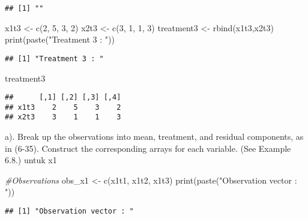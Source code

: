 \documentclass[
]{article}
\newenvironment{Shaded}{\begin{snugshade}}{\end{snugshade}}
\newcommand{\CommentTok}[1]{\textcolor[rgb]{0.56,0.35,0.01}{\textit{#1}}}
\newcommand{\DecValTok}[1]{\textcolor[rgb]{0.00,0.00,0.81}{#1}}
\newcommand{\FunctionTok}[1]{\textcolor[rgb]{0.00,0.00,0.00}{#1}}
\newcommand{\NormalTok}[1]{#1}
\newcommand{\OtherTok}[1]{\textcolor[rgb]{0.56,0.35,0.01}{#1}}
\newcommand{\StringTok}[1]{\textcolor[rgb]{0.31,0.60,0.02}{#1}}
\begin{document}
\begin{verbatim}
## [1] ""
\end{verbatim}

\begin{Shaded}
\begin{Highlighting}[]
\NormalTok{x1t3 }\OtherTok{\textless{}{-}} \FunctionTok{c}\NormalTok{(}\DecValTok{2}\NormalTok{, }\DecValTok{5}\NormalTok{, }\DecValTok{3}\NormalTok{, }\DecValTok{2}\NormalTok{)}
\NormalTok{x2t3 }\OtherTok{\textless{}{-}} \FunctionTok{c}\NormalTok{(}\DecValTok{3}\NormalTok{, }\DecValTok{1}\NormalTok{, }\DecValTok{1}\NormalTok{, }\DecValTok{3}\NormalTok{)}
\NormalTok{treatment3 }\OtherTok{\textless{}{-}} \FunctionTok{rbind}\NormalTok{(x1t3,x2t3)}
\FunctionTok{print}\NormalTok{(}\FunctionTok{paste}\NormalTok{(}\StringTok{"Treatment 3 : "}\NormalTok{))}
\end{Highlighting}
\end{Shaded}

\begin{verbatim}
## [1] "Treatment 3 : "
\end{verbatim}

\begin{Shaded}
\begin{Highlighting}[]
\NormalTok{treatment3}
\end{Highlighting}
\end{Shaded}

\begin{verbatim}
##      [,1] [,2] [,3] [,4]
## x1t3    2    5    3    2
## x2t3    3    1    1    3
\end{verbatim}

a). Break up the observations into mean, treatment, and residual
components, as in (6-35). Construct the corresponding arrays for each
variable. (See Example 6.8.) untuk x1

\begin{Shaded}
\begin{Highlighting}[]
\CommentTok{\#Observations}
\NormalTok{obs\_x1 }\OtherTok{\textless{}{-}} \FunctionTok{c}\NormalTok{(x1t1, x1t2, x1t3)}
\FunctionTok{print}\NormalTok{(}\FunctionTok{paste}\NormalTok{(}\StringTok{"Observation vector : "}\NormalTok{))}
\end{Highlighting}
\end{Shaded}

\begin{verbatim}
## [1] "Observation vector : "
\end{verbatim}
\end{document}
